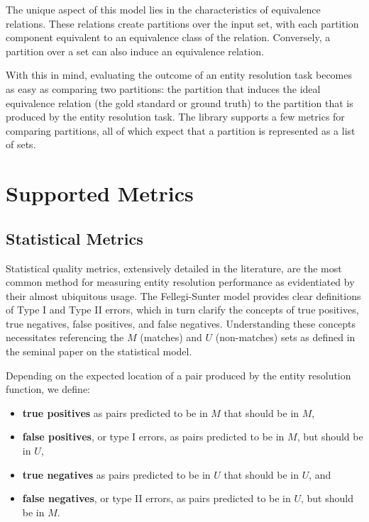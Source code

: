 \documentclass[11pt]{article}
\begin{document}
    The unique aspect of this model lies in the characteristics of equivalence
    relations\cite{halmos1960naive}.
    These relations create partitions over the input set, with each partition
    component equivalent to an equivalence class of the relation\cite{Tal11}.
    Conversely, a partition over a set can also induce an equivalence relation.

    With this in mind, evaluating the outcome of an entity resolution task
    becomes as easy as comparing two partitions: the partition that induces the
    ideal equivalence relation (the gold standard or ground truth) to the
    partition that is produced by the entity resolution task.
    The library supports a few metrics for comparing partitions, all of which
    expect that a partition is represented as a list of sets.

    \section{Supported Metrics}\label{sec:metrics}
    
    \subsection{Statistical Metrics}
    Statistical quality metrics, extensively detailed in the
    literature\cite{manning2008,hitesh2012}, are the most common method for
    measuring entity resolution performance as evidentiated by their almost
    ubiquitous usage\cite{fever2009,Goga2015,deepm2020,eager2021}.
    The Fellegi-Sunter model provides clear definitions of Type I and Type II
    errors\cite{winkler1990}, which in turn clarify the concepts of true
    positives, true negatives, false positives, and false negatives.
    Understanding these concepts necessitates referencing the $M$ (matches) and
    $U$ (non-matches) sets as defined in the seminal paper on the statistical
    model.

    Depending on the expected location of a pair produced by the entity
    resolution function, we define:

    \begin{itemize}
        \item \textbf{true positives} as pairs predicted to be in $M$ that
        should be in $M$,
        \item \textbf{false positives}, or type I errors, as pairs predicted to
        be in $M$, but should be in $U$,
        \item \textbf{true negatives} as pairs predicted to be in $U$ that
        should be in $U$, and
        \item \textbf{false negatives}, or type II errors, as pairs predicted to
        be in $U$, but should be in $M$.
    \end{itemize}
\end{document}
